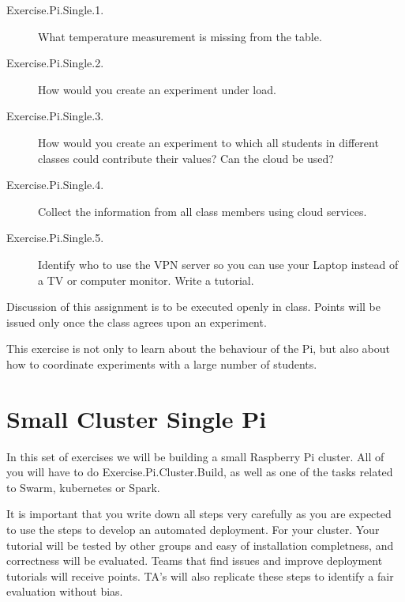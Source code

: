 \begin{description}

\item[Exercise.Pi.Single.1.] What temperature measurement is missing from the
  table. 

\item[Exercise.Pi.Single.2.] How would you create an experiment under {\en load}.

\item[Exercise.Pi.Single.3.] How would you create an experiment to which all
  students in different classes could contribute their values? Can the
  cloud be used?

\item[Exercise.Pi.Single.4.] Collect the information from all class members
  using cloud services.

\item[Exercise.Pi.Single.5.] Identify who to use the VPN server so you
  can use your Laptop instead of a TV or computer monitor. Write a tutorial.

\end{description}

Discussion of this assignment is to be executed openly in
class. Points will be issued only once the class agrees upon an
experiment.

This exercise is not only to learn about the behaviour of the Pi, but
also about how to coordinate experiments with a large number of
students.

\section{Small Cluster Single Pi}

In this set of exercises we will be building a small Raspberry Pi
cluster. All of you will have to do Exercise.Pi.Cluster.Build, as well
as one of the tasks related to Swarm, kubernetes or Spark.

It is important that you write down all steps very carefully as you
are expected to use the steps to develop an automated deployment. For
your cluster. Your tutorial will be tested by other groups and easy of
installation completness, and correctness will be evaluated.  Teams
that find issues and improve deployment tutorials will receive points.
TA's will also replicate these steps to identify a fair evaluation
without bias.

